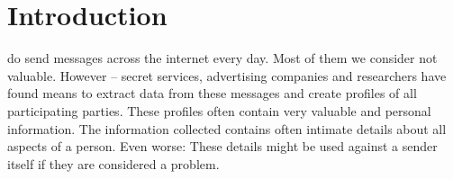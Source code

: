 \documentclass[12pt,journal,compsoc,peerreview]{IEEEtran}
\begin{document}
\section{Introduction}
%
%



% 
% 
% 
% 
 do send messages across the internet every day. Most of them we consider not valuable. However -- secret services, advertising companies and researchers have found means to extract data from these messages and create profiles of all participating parties. These profiles often contain very valuable and personal information. The information collected contains often intimate details about all aspects of a person. Even worse: These details might be used against a sender itself if they are considered a problem. \par
\end{document}
